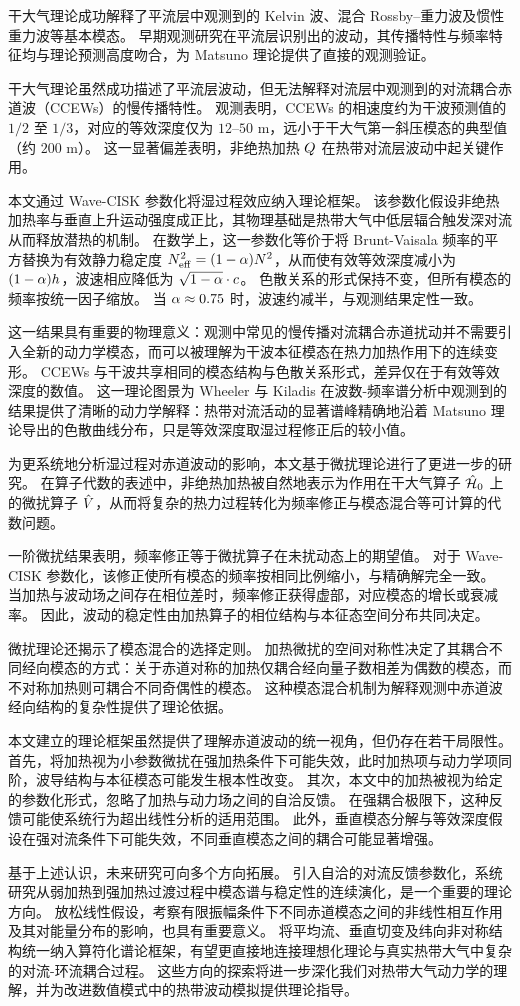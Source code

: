 干大气理论成功解释了平流层中观测到的 Kelvin 波、混合 Rossby--重力波及惯性重力波等基本模态。
早期观测研究在平流层识别出的波动，其传播特性与频率特征均与理论预测高度吻合，为 Matsuno 理论提供了直接的观测验证。

干大气理论虽然成功描述了平流层波动，但无法解释对流层中观测到的对流耦合赤道波（CCEWs）的慢传播特性。
观测表明，CCEWs 的相速度约为干波预测值的 $1/2$ 至 $1/3$，对应的等效深度仅为 $12$--$50$ m，远小于干大气第一斜压模态的典型值（约 $200$ m）。
这一显著偏差表明，非绝热加热 $Q$ 在热带对流层波动中起关键作用。

本文通过 Wave-CISK 参数化将湿过程效应纳入理论框架。
该参数化假设非绝热加热率与垂直上升运动强度成正比，其物理基础是热带大气中低层辐合触发深对流从而释放潜热的机制。
在数学上，这一参数化等价于将 Brunt-Vaisala 频率的平方替换为有效静力稳定度 $N_{\mathrm{eff}}^2 = (1-\alpha)N^2$，从而使有效等效深度减小为 $(1-\alpha)h$，波速相应降低为 $\sqrt{1-\alpha}\cdot c$。
色散关系的形式保持不变，但所有模态的频率按统一因子缩放。
当 $\alpha \approx 0.75$ 时，波速约减半，与观测结果定性一致。

这一结果具有重要的物理意义：观测中常见的慢传播对流耦合赤道扰动并不需要引入全新的动力学模态，而可以被理解为干波本征模态在热力加热作用下的连续变形。
CCEWs 与干波共享相同的模态结构与色散关系形式，差异仅在于有效等效深度的数值。
这一理论图景为 Wheeler 与 Kiladis 在波数-频率谱分析中观测到的结果提供了清晰的动力学解释：热带对流活动的显著谱峰精确地沿着 Matsuno 理论导出的色散曲线分布，只是等效深度取湿过程修正后的较小值。

为更系统地分析湿过程对赤道波动的影响，本文基于微扰理论进行了更进一步的研究。
在算子代数的表述中，非绝热加热被自然地表示为作用在干大气算子 $\hat{\mathcal{H}}_0$ 上的微扰算子 $\hat{V}$，从而将复杂的热力过程转化为频率修正与模态混合等可计算的代数问题。

一阶微扰结果表明，频率修正等于微扰算子在未扰动态上的期望值。
对于 Wave-CISK 参数化，该修正使所有模态的频率按相同比例缩小，与精确解完全一致。
当加热与波动场之间存在相位差时，频率修正获得虚部，对应模态的增长或衰减率。
因此，波动的稳定性由加热算子的相位结构与本征态空间分布共同决定。

微扰理论还揭示了模态混合的选择定则。
加热微扰的空间对称性决定了其耦合不同经向模态的方式：关于赤道对称的加热仅耦合经向量子数相差为偶数的模态，而不对称加热则可耦合不同奇偶性的模态。
这种模态混合机制为解释观测中赤道波经向结构的复杂性提供了理论依据。

本文建立的理论框架虽然提供了理解赤道波动的统一视角，但仍存在若干局限性。
首先，将加热视为小参数微扰在强加热条件下可能失效，此时加热项与动力学项同阶，波导结构与本征模态可能发生根本性改变。
其次，本文中的加热被视为给定的参数化形式，忽略了加热与动力场之间的自洽反馈。
在强耦合极限下，这种反馈可能使系统行为超出线性分析的适用范围。
此外，垂直模态分解与等效深度假设在强对流条件下可能失效，不同垂直模态之间的耦合可能显著增强。

基于上述认识，未来研究可向多个方向拓展。
引入自洽的对流反馈参数化，系统研究从弱加热到强加热过渡过程中模态谱与稳定性的连续演化，是一个重要的理论方向。
放松线性假设，考察有限振幅条件下不同赤道模态之间的非线性相互作用及其对能量分布的影响，也具有重要意义。
将平均流、垂直切变及纬向非对称结构统一纳入算符化谱论框架，有望更直接地连接理想化理论与真实热带大气中复杂的对流-环流耦合过程。
这些方向的探索将进一步深化我们对热带大气动力学的理解，并为改进数值模式中的热带波动模拟提供理论指导。
